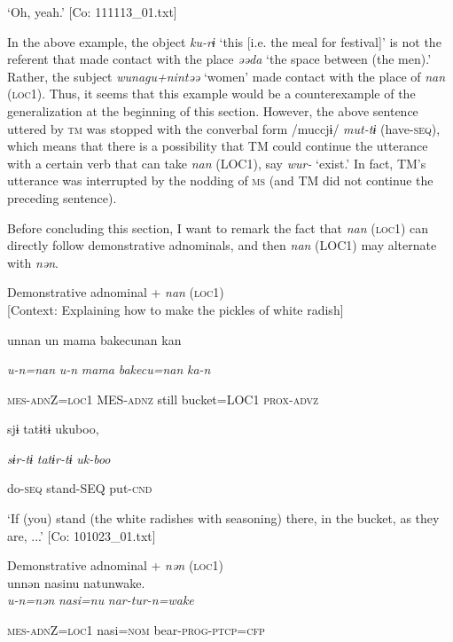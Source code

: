 \glt    ‘Oh, yeah.’ [Co: 111113\_01.txt]
\z

In the above example, the object \textit{ku-rɨ} ‘this [i.e. the meal for festival]’ is not the referent that made contact with the place \textit{əəda} ‘the space between (the men).’ Rather, the subject \textit{wunagu+nintəə} ‘women’ made contact with the place of \textit{nan} (\textsc{loc}1). Thus, it seems that this example would be a counterexample of the generalization at the beginning of this section. However, the above sentence uttered by \textsc{tm} was stopped with the converbal form /muccjɨ/ \textit{mut-tɨ} (have-\textsc{seq}), which means that there is a possibility that TM could continue the utterance with a certain verb that can take \textit{nan} (LOC1), say \textit{wur-} ‘exist.’ In fact, TM’s utterance was interrupted by the nodding of \textsc{ms} (and TM did not continue the preceding sentence).

Before concluding this section, I want to remark the fact that \textit{nan} (\textsc{loc}1) can directly follow demonstrative adnominals, and then \textit{nan} (LOC1) may alternate with \textit{nən}.

\ea\label{ex:6-64}
\ea Demonstrative adnominal + \textit{nan} (\textsc{loc}1)\\{}
[Context: Explaining how to make the pickles of white radish]

{\TM}
\gll unnan  un  mama  {\textbar}bakecu{\textbar}nan  kan

      \textit{u-n=nan}  \textit{u-n}  \textit{mama}  \textit{bakecu=nan}  \textit{ka-n}

      \textsc{mes}-\textsc{adn}Z=\textsc{loc}1  MES-\textsc{adnz}  still  bucket=LOC1  \textsc{prox}-\textsc{advz}

      sjɨ  tatɨtɨ  ukuboo,

      \textit{sɨr-tɨ}  \textit{tatɨr-tɨ}  \textit{uk-boo}

      do-\textsc{seq}  stand-SEQ  put-\textsc{cnd}

\glt ‘If (you) stand (the white radishes with seasoning) there, in the bucket, as they are, ...’ [Co: 101023\_01.txt]
\z

 \ex Demonstrative adnominal + \textit{nən} (\textsc{loc}1)\\
{\TM}
\gll  unnən  nasinu  natunwake.\\

      \textit{u-n=nən}  \textit{nasi=nu}  \textit{nar-tur-n=wake}

      \textsc{mes}-\textsc{adn}Z=\textsc{loc}1  nasi=\textsc{nom}  bear-\textsc{prog}-\textsc{ptcp}=\textsc{cfp}


